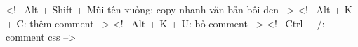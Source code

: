 <!-- Alt + Shift + Mũi tên xuống: copy nhanh văn bản bôi đen -->
<!-- Alt + K + C: thêm comment -->
<!-- Alt + K + U: bỏ comment -->
<!-- Ctrl + /: comment css -->